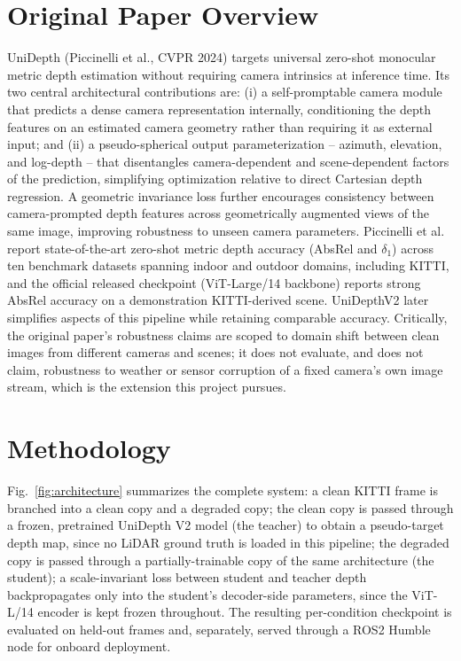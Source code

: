 \documentclass[conference]{IEEEtran}
\begin{document}
\section{Original Paper Overview}

UniDepth \cite{ref1} (Piccinelli et al., CVPR 2024) targets universal zero-shot monocular metric depth estimation without requiring camera intrinsics at inference time. Its two central architectural contributions are: (i) a self-promptable camera module that predicts a dense camera representation internally, conditioning the depth features on an estimated camera geometry rather than requiring it as external input; and (ii) a pseudo-spherical output parameterization -- azimuth, elevation, and log-depth -- that disentangles camera-dependent and scene-dependent factors of the prediction, simplifying optimization relative to direct Cartesian depth regression. A geometric invariance loss further encourages consistency between camera-prompted depth features across geometrically augmented views of the same image, improving robustness to unseen camera parameters. Piccinelli et al. report state-of-the-art zero-shot metric depth accuracy (AbsRel and $\delta_1$) across ten benchmark datasets spanning indoor and outdoor domains, including KITTI, and the official released checkpoint (ViT-Large/14 backbone) reports strong AbsRel accuracy on a demonstration KITTI-derived scene. UniDepthV2 \cite{ref8} later simplifies aspects of this pipeline while retaining comparable accuracy. Critically, the original paper's robustness claims are scoped to domain shift between clean images from different cameras and scenes; it does not evaluate, and does not claim, robustness to weather or sensor corruption of a fixed camera's own image stream, which is the extension this project pursues.

\section{Methodology}

Fig.~\ref{fig:architecture} summarizes the complete system: a clean KITTI frame is branched into a clean copy and a degraded copy; the clean copy is passed through a frozen, pretrained UniDepth V2 model (the teacher) to obtain a pseudo-target depth map, since no LiDAR ground truth is loaded in this pipeline; the degraded copy is passed through a partially-trainable copy of the same architecture (the student); a scale-invariant loss between student and teacher depth backpropagates only into the student's decoder-side parameters, since the ViT-L/14 encoder is kept frozen throughout. The resulting per-condition checkpoint is evaluated on held-out frames and, separately, served through a ROS2 Humble node for onboard deployment.
\end{document}
